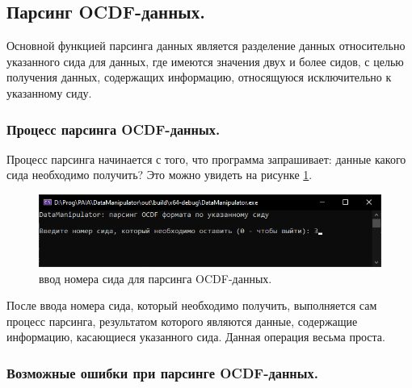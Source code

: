 \subsection{ \standartTitleFont
  Парсинг OCDF-данных. 
}

{\standartFont

  \par Основной функцией парсинга данных является разделение данных относительно указанного сида для данных, где имеются значения двух и более сидов, с целью получения данных, содержащих информацию, относящуюся исключительно к указанному сиду.

  \par 
}

\subsubsection{ \standartTitleFont
  Процесс парсинга OCDF-данных. 
}

{\standartFont

  \par Процесс парсинга начинается с того, что программа запрашивает: данные какого сида необходимо получить? Это можно увидеть на рисунке \ref{fig:OCDFdataParsSt}.

  \begin{figure}[H]
    \centering
    \includegraphics[width=\textwidth]{images/forDataManipulator/OCDFdataParcing.png}
    \caption{ввод номера сида для парсинга OCDF-данных.} 

    \label{fig:OCDFdataParsSt}
  \end{figure}

  \par После ввода номера сида, который необходимо получить, выполняется сам процесс парсинга, результатом которого являются данные, содержащие информацию, касающиеся указанного сида. Данная операция весьма проста.

  \par 
}

\subsubsection{ \standartTitleFont
  Возможные ошибки при парсинге OCDF-данных.
}

